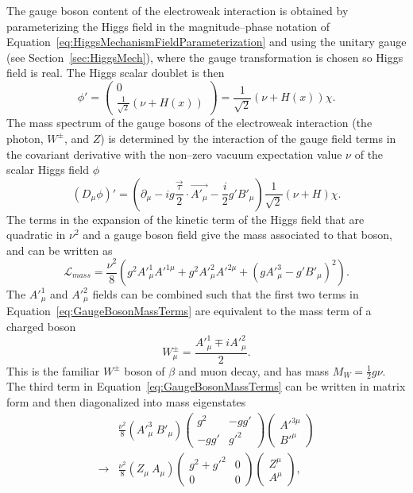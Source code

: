 The gauge boson content of the electroweak interaction is obtained by
parameterizing the Higgs field in the magnitude--phase notation of
Equation~\ref{eq:HiggsMechanismFieldParameterization} and using the unitary
gauge (see Section~\ref{sec:HiggsMech}), where the gauge transformation is
chosen so Higgs field is real.  The Higgs scalar doublet is then 
\begin{equation}
  \phi' =  \left(\begin{array}{c} 0 \\ \frac{1}{\sqrt 2}(\nu +
    H(x))\end{array}\right) = 
    \frac{1}{\sqrt 2}(\nu + H(x))\chi.
    \nonumber
\end{equation}
The mass spectrum of the gauge bosons of the electroweak interaction (the
photon, $W^\pm$, and $Z$) is determined by the interaction of the gauge field
terms in the covariant derivative with the non--zero vacuum expectation value
$\nu$ of the scalar Higgs field $\phi$
\begin{equation}
  (D_\mu\phi)' = (\partial_\mu - i g \frac{\vec \tau}{2}\cdot \vec{A'_\mu} -
  \frac{i}{2}g'B'_\mu)\frac{1}{\sqrt 2}(\nu + H)\chi.
  \nonumber
\end{equation}
The terms in the expansion of the kinetic term of the Higgs field that are
quadratic in $\nu^2$ and a gauge boson field give the mass associated to that
boson, and can be written as
\begin{equation}
  \mathcal{L}_{mass} = \frac{\nu^2}{8}(
  g^2 A'^1_\mu A'^{1\mu} + g^2 A'^2_\mu A'^{2\mu} + (g A'^3_\mu - g'B'_\mu)^2).
  \label{eq:GaugeBosonMassTerms}
\end{equation}
The $A'^1_\mu$ and $A'^2_\mu$ fields can be combined such that the first two
terms in Equation~\ref{eq:GaugeBosonMassTerms} are equivalent to the mass term
of a charged boson
\begin{equation}
  W^\pm_\mu = \frac{A'^{1}_\mu \mp iA'^2_\mu}{2}.
  \nonumber
\end{equation}
This is the familiar $W^\pm$ boson of $\beta$ and muon decay, and has mass $M_W
= \frac{1}{2}g\nu$.  The third term in Equation~\ref{eq:GaugeBosonMassTerms} can
be written in matrix form and then diagonalized into mass eigenstates
\begin{eqnarray}
  &\frac{\nu^2}{8}(A'^3_\mu~B'_\mu) 
  \left(
  \begin{array}{cc}
    g^2 & -gg' \\
    -gg' & g'^2 
  \end{array}
  \right)
  \left(
  \begin{array}{c}
    A'^{3\mu} \\
    B'^\mu
  \end{array}
  \right) \nonumber \\
  \to & 
  \frac{\nu^2}{8}(Z_\mu~A_\mu) 
  \left(
  \begin{array}{cc}
    g^2 + g'^2  & 0\\
    0 & 0 
  \end{array}
  \right)
  \left(
  \begin{array}{c}
    Z^\mu \\
    A^\mu
  \end{array}
  \right), \nonumber 
\end{eqnarray}
